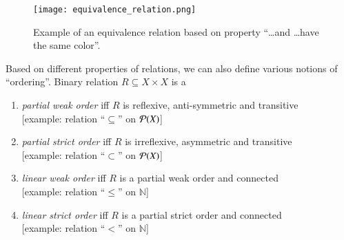 \documentclass[nobib,nofonts]{tufte-handout}
\newcommand{\mygray}[1]{\textcolor{mygray2}{#1}}
\begin{document}
\begin{figure*}
  \texttt{[image: equivalence\_relation.png]}
  \caption{Example of an equivalence relation based on property ``\dots and \dots have the same
  color''.}
  \label{fig:equivRel}
\end{figure*}

\noindent Based on different properties of relations, we can also define various notions of
``ordering''. Binary relation $R \subseteq X \times X$ is a
\begin{enumerate}
\item[] \emph{partial weak order} iff $R$ is reflexive, anti-symmetric and transitive \\
  \hfill \mygray{[example: relation ``$\subseteq$'' on $\mathcal{P}(X)$]}
\item[] \emph{partial strict order} iff $R$ is irreflexive, asymmetric and transitive \\
  \hfill \mygray{[example: relation ``$\subset$'' on $\mathcal{P}(X)$]}
\item[] \emph{linear weak order} iff $R$ is a partial weak order and connected \\
  \hfill \mygray{[example: relation ``$\le$'' on $\mathds{N}$]}
\item[] \emph{linear strict order} iff $R$ is a partial strict order and connected \\
  \hfill \mygray{[example: relation ``$<$'' on $\mathds{N}$]}
\end{enumerate}
\end{document}

